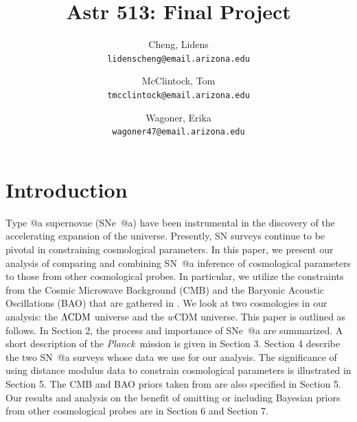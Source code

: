 \documentclass[12pt,a4paper]{article}
\author{
  Cheng, Lidens\\
  \texttt{lidenscheng@email.arizona.edu}
  \and
  McClintock, Tom\\
  \texttt{tmcclintock@email.arizona.edu}
  \and
  Wagoner, Erika\\
  \texttt{wagoner47@email.arizona.edu}
}
\title{Astr 513: Final Project}
\makeatletter
\newcommand\Planck{{\it Planck}\ }
\newcommand*{\rom}[1]{\expandafter\@slowromancap\romannumeral #1@}
\newcommand{\sn}{\mbox{SN}}
\newcommand{\sna}{\mbox{SN \rom{1}a}}
\newcommand{\snea}{\mbox{SNe \rom{1}a}}
\makeatother
\begin{document}
\maketitle

\section{Introduction}
\label{sec:Intro}
Type \rom{1}a supernovae (\snea{}) have been instrumental in the discovery 
of the accelerating expansion of the universe. Presently, {\sn} surveys continue 
to be pivotal in constraining cosmological parameters. In this paper, we present 
our analysis of comparing and combining {\sna} inference of cosmological parameters 
to those from other cosmological probes. In particular, we utilize the constraints 
from the Cosmic Microwave Background (CMB) and the Baryonic Acoustic Oscillations 
(BAO) that are gathered in \citet{planck2013}. We look at two cosmologies in our 
analysis: the $\Lambda \textnormal{CDM}$ universe and the $w$CDM universe. This 
paper is outlined as follows. In Section 2, the process and importance of {\snea} 
are summarized. A short description of the \Planck mission is given in Section 3. 
Section 4 describe the two {\sna} surveys whose data we use for our analysis. The 
significance of using distance modulus data to constrain cosmological parameters 
is illustrated in Section 5. The CMB and BAO priors taken from \citet{planck2013} 
are also specified in Section 5. Our results and analysis on the benefit of omitting 
or including Bayesian priors from other cosmological probes 
are in Section 6 and Section 7.  
\end{document}
